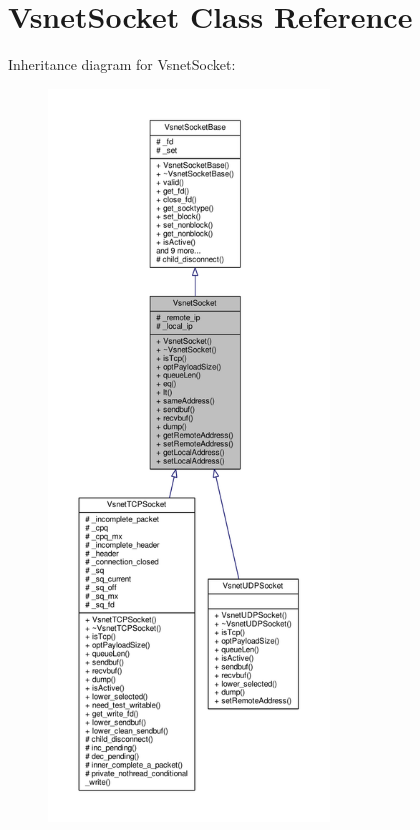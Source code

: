 \hypertarget{classVsnetSocket}{}\section{Vsnet\+Socket Class Reference}
\label{classVsnetSocket}


Inheritance diagram for Vsnet\+Socket\+:
\nopagebreak
\begin{figure}[H]
\begin{center}
\leavevmode
\includegraphics[height=550pt]{d0/d1b/classVsnetSocket__inherit__graph}
\end{center}
\end{figure}


